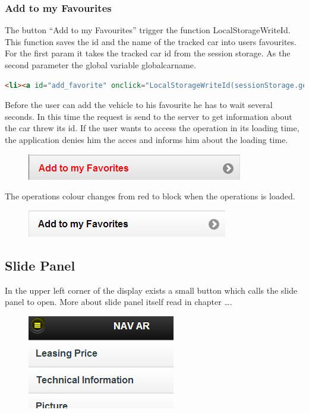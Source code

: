 \subsubsection{Add to my Favourites}
The button “Add to my Favourites” trigger the function LocalStorageWriteId. This function saves the id and the name of the tracked car into users favourites. For the first param it takes the tracked car id from the session storage. As the second parameter the global variable globalcarname.
\\
\begin{lstlisting}[language=html, caption= 
start timer function,captionpos=b]
<li><a id="add_favorite" onclick="LocalStorageWriteId(sessionStorage.getItem('id'),globalcarname);" style="color:red" rel="external" >Add to my Favorites</a></li>
\end{lstlisting}
Before the user can add the vehicle to his favourite he has to wait several seconds. In this time the request is send to the server to get information about the car threw its id. If the user wants to access the operation in its loading time, the application denies him the acces and informs him about the loading time.
\\
\begin{figure}[h]
\centering
\includegraphics[width=0.6\linewidth]{graphics/chapter4/11}
\caption{}
\label{fig:12}
\end{figure}

The operations colour changes from red to block when the operations is loaded.
\\
\begin{figure}[h]
\centering
\includegraphics[width=0.6\linewidth]{graphics/chapter4/12}
\caption{}
\label{fig:13}
\end{figure}


\subsection{Slide Panel}
In the upper left corner of the display exists a small button which calls the slide panel to open. More about slide panel itself read in chapter ….
\\
\begin{figure}[h]
\centering
\includegraphics[width=0.4\linewidth]{graphics/chapter4/13}
\caption{}
\label{fig:14}
\end{figure}

